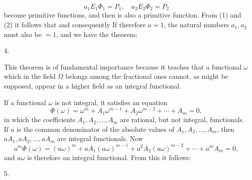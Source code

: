 \[
a_1E_1\Phi_1 = P_1, \quad a_2E_2\Phi_2 = P_2
\]
become primitive functions, and then
is also a primitive function. From (1) and (2) it follows that
and consequently
If therefore $a=1$, the natural numbers $a_1, a_2$ must also be $=1$, and we have the theorem:

4. 

This theorem is of fundamental importance because it teaches that a functional $\omega$ which in the field $\Omega$ belongs among the fractional ones cannot, as might be supposed, appear in a higher field as an integral functional.

If a functional $\omega$ is not integral, it satisfies an equation
\[
\Phi(\omega) = \omega^m + A_1\omega^{m-1} + A_2\omega^{m-2} + \cdots + A_m = 0,
\]
in which the coefficients $A_1, A_2, \ldots, A_m$ are rational, but not integral, functionals. If $a$ is the common denominator of the absolute values of $A_1, A_2, \ldots, A_m$, then $aA_1, aA_2, \ldots, aA_m$ are integral functionals. Now
\[
a^m\Phi(\omega) = (a\omega)^m + aA_1(a\omega)^{m-1} + a^2A_2(a\omega)^{m-2} + \cdots
+ a^mA_m = 0,
\]
and $a\omega$ is therefore an integral functional. From this it follows:

5. 
